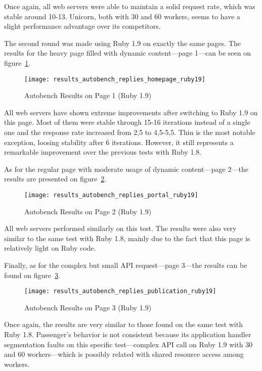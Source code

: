 Once again, all web servers were able to maintain a solid request rate, which was stable around 10-13. Unicorn, both with 30 and 60 workers, seems to have a slight performance advantage over its competitors.

The second round was made using Ruby 1.9 on exactly the same pages. The results for the heavy page filled with dynamic content---page 1---can be seen on figure~\ref{fig:page1_autobench_ruby19_results}.
\begin{figure}[h!t]
  \centering
    \caption{Autobench Results on Page 1 (Ruby 1.9)}
    \texttt{[image: results\_autobench\_replies\_homepage\_ruby19]}
  \label{fig:page1_autobench_ruby19_results}
\end{figure}

All web servers have shown extreme improvements after switching to Ruby 1.9 on this page. Most of them were stable through 15-16 iterations instead of a single one and the response rate increased from 2,5 to 4,5-5,5. Thin is the most notable exception, loosing stability after 6 iterations. However, it still represents a remarkable improvement over the previous tests with Ruby 1.8.

As for the regular page with moderate usage of dynamic content---page 2---the results are presented on figure~\ref{fig:page2_autobench_ruby19_results}.
\begin{figure}[h!t]
  \centering
    \caption{Autobench Results on Page 2 (Ruby 1.9)}
    \texttt{[image: results\_autobench\_replies\_portal\_ruby19]}
  \label{fig:page2_autobench_ruby19_results}
\end{figure}

All web servers performed similarly on this test. The results were also very similar to the same test with Ruby 1.8, mainly due to the fact that this page is relatively light on Ruby code.

Finally, as for the complex but small API request---page 3---the results can be found on figure~\ref{fig:page3_autobench_ruby19_results}.
\begin{figure}[h!t]
  \centering
    \caption{Autobench Results on Page 3 (Ruby 1.9)}
    \texttt{[image: results\_autobench\_replies\_publication\_ruby19]}
  \label{fig:page3_autobench_ruby19_results}
\end{figure}

Once again, the results are very similar to those found on the same test with Ruby 1.8. Passenger's behavior is not consistent because its application handler segmentation faults on this specific test---complex API call on Ruby 1.9 with 30 and 60 workers---which is possibly related with shared resource access among workers.

